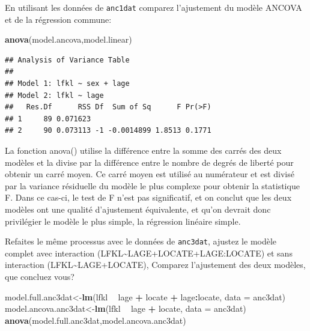 \documentclass[12pt,]{book}
\makeatletter
\newenvironment{Shaded}{\begin{snugshade}}{\end{snugshade}}
\newcommand{\DataTypeTok}[1]{\textcolor[rgb]{0.13,0.29,0.53}{#1}}
\newcommand{\KeywordTok}[1]{\textcolor[rgb]{0.13,0.29,0.53}{\textbf{#1}}}
\newcommand{\NormalTok}[1]{#1}
\newcommand{\OperatorTok}[1]{\textcolor[rgb]{0.81,0.36,0.00}{\textbf{#1}}}
\newcommand{\StringTok}[1]{\textcolor[rgb]{0.31,0.60,0.02}{#1}}
\newenvironment{kframe}{%
\medskip{}
\setlength{\fboxsep}{.8em}
\def\at@end@of@kframe{}%
\ifinner\ifhmode%
 \def\at@end@of@kframe{\end{minipage}}%
 \begin{minipage}{\columnwidth}%
\fi\fi%
\def\FrameCommand##1{\hskip\@totalleftmargin \hskip-\fboxsep
\colorbox{incolor}{##1}\hskip-\fboxsep
    \hskip-\linewidth \hskip-\@totalleftmargin \hskip\columnwidth}%
\MakeFramed {\advance\hsize-\width
  \@totalleftmargin\z@ \linewidth\hsize
  \@setminipage}}%
{\par\unskip\endMakeFramed%
\at@end@of@kframe}
\newenvironment{rmdblock}[1]
 {
 \begin{itemize}
 \renewcommand{\labelitemi}{
   \raisebox{-.7\height}[0pt][0pt]{
     {\setkeys{Gin}{width=3em,keepaspectratio}\texttt{[image: images/\#1]}}
   }
 }
 \begin{kframe}
 \setlength{\fboxsep}{1em}
 \item
 }
 {
 \end{kframe}
 \end{itemize}
 }
\newenvironment{rmdcode}
  {\begin{rmdblock}{screen}}
  {\end{rmdblock}}
\makeatother
\begin{document}
\begin{rmdcode}
En utilisant les données de \texttt{anc1dat} comparez l'ajustement du modèle ANCOVA et de la régression commune:
\end{rmdcode}

\begin{Shaded}
\begin{Highlighting}[]
\KeywordTok{anova}\NormalTok{(model.ancova,model.linear)}
\end{Highlighting}
\end{Shaded}

\begin{verbatim}
## Analysis of Variance Table
## 
## Model 1: lfkl ~ sex + lage
## Model 2: lfkl ~ lage
##   Res.Df      RSS Df  Sum of Sq      F Pr(>F)
## 1     89 0.071623                            
## 2     90 0.073113 -1 -0.0014899 1.8513 0.1771
\end{verbatim}

La fonction anova() utilise la différence entre la somme des carrés des deux modèles et la divise par la différence entre le nombre de degrés de liberté pour obtenir un carré moyen. Ce carré moyen est utilisé au numérateur et est divisé par la variance résiduelle du modèle le plus complexe pour obtenir la statistique F. Dans ce cas-ci, le test de F n'est pas significatif, et on conclut que les deux modèles ont une qualité d'ajustement équivalente, et qu'on devrait donc privilégier le modèle le plus simple, la régression linéaire simple.

\begin{rmdcode}
Refaites le même processus avec le données de \texttt{anc3dat}, ajustez le modèle complet avec interaction (LFKL\textasciitilde{}LAGE+LOCATE+LAGE:LOCATE) et sans interaction (LFKL\textasciitilde{}LAGE+LOCATE), Comparez l'ajustement des deux modèles, que concluez vous?
\end{rmdcode}

\begin{Shaded}
\begin{Highlighting}[]
\NormalTok{model.full.anc3dat<-}\KeywordTok{lm}\NormalTok{(lfkl }\OperatorTok{~}\StringTok{ }\NormalTok{lage }\OperatorTok{+}\StringTok{ }\NormalTok{locate }\OperatorTok{+}\StringTok{ }\NormalTok{lage}\OperatorTok{:}\NormalTok{locate, }\DataTypeTok{data =}\NormalTok{ anc3dat)}
\NormalTok{model.ancova.anc3dat<-}\KeywordTok{lm}\NormalTok{(lfkl }\OperatorTok{~}\StringTok{ }\NormalTok{lage }\OperatorTok{+}\StringTok{ }\NormalTok{locate, }\DataTypeTok{data =}\NormalTok{ anc3dat)}
\KeywordTok{anova}\NormalTok{(model.full.anc3dat,model.ancova.anc3dat)}
\end{Highlighting}
\end{Shaded}
\end{document}
